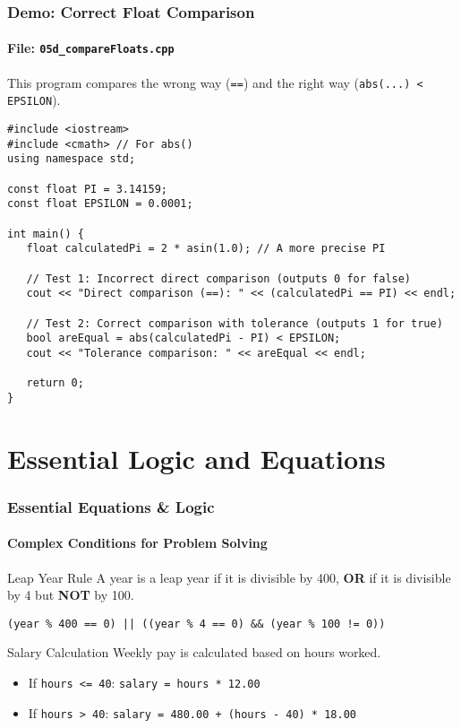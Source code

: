 \documentclass{beamer}
\begin{document}
\begin{frame}[fragile]
\frametitle{Demo: Correct Float Comparison}
\framesubtitle{File: \texttt{05d\_compareFloats.cpp}}
This program compares the wrong way (\texttt{==}) and the right way (\texttt{abs(...) < EPSILON}).

\begin{verbatim}
#include <iostream>
#include <cmath> // For abs()
using namespace std;

const float PI = 3.14159;
const float EPSILON = 0.0001;

int main() {
   float calculatedPi = 2 * asin(1.0); // A more precise PI

   // Test 1: Incorrect direct comparison (outputs 0 for false)
   cout << "Direct comparison (==): " << (calculatedPi == PI) << endl;

   // Test 2: Correct comparison with tolerance (outputs 1 for true)
   bool areEqual = abs(calculatedPi - PI) < EPSILON;
   cout << "Tolerance comparison: " << areEqual << endl;

   return 0;
}
\end{verbatim}
\end{frame}

\section{Essential Logic and Equations}

\begin{frame}
\frametitle{Essential Equations \& Logic}
\framesubtitle{Complex Conditions for Problem Solving}
\begin{block}{Leap Year Rule}
A year is a leap year if it is divisible by 400, \textbf{OR} if it is divisible by 4 but \textbf{NOT} by 100.
\begin{center}
\texttt{(year \% 400 == 0) || ((year \% 4 == 0) \&\& (year \% 100 != 0))}
\end{center}
\end{block}
\pause
\begin{block}{Salary Calculation}
Weekly pay is calculated based on hours worked.
\begin{itemize}
    \item If \texttt{hours <= 40}: \quad \texttt{salary = hours * 12.00}
    \item If \texttt{hours > 40}: \quad \texttt{salary = 480.00 + (hours - 40) * 18.00}
\end{itemize}
\end{block}
\end{frame}
\end{document}
